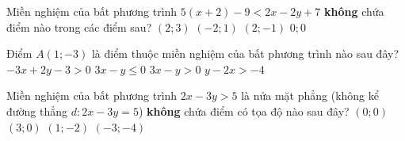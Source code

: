 \begin{ex}%
	Miền nghiệm của bất phương trình $5(x+2)-9<2x-2y+7$ \textbf{không} chứa điểm nào trong các điểm sau?
	\choice
	{\True $(2;3)$}
	{$(-2;1)$}
	{$(2;-1)$}
	{$0;0$}
\end{ex}

\begin{ex}%
	Điểm $A(1;-3)$ là điểm thuộc miền nghiệm của bất phương trình nào sau đây?
	\choice
	{$-3x+2y-3>0$}
	{$3x-y\le 0$}
	{\True $3x-y>0$}
	{$y-2x>-4$}
\end{ex}	

\begin{ex}%
	Miền nghiệm của bất phương trình $2x-3y>5$ là nửa mặt phẳng (không kể đường thẳng $d:2x-3y=5$) \textbf{không} chứa điểm có tọa độ nào sau đây?
	\choice
	{\True $(0;0)$}
	{$(3;0)$}
	{$(1;-2)$}
	{$(-3;-4)$}	
\end{ex}

